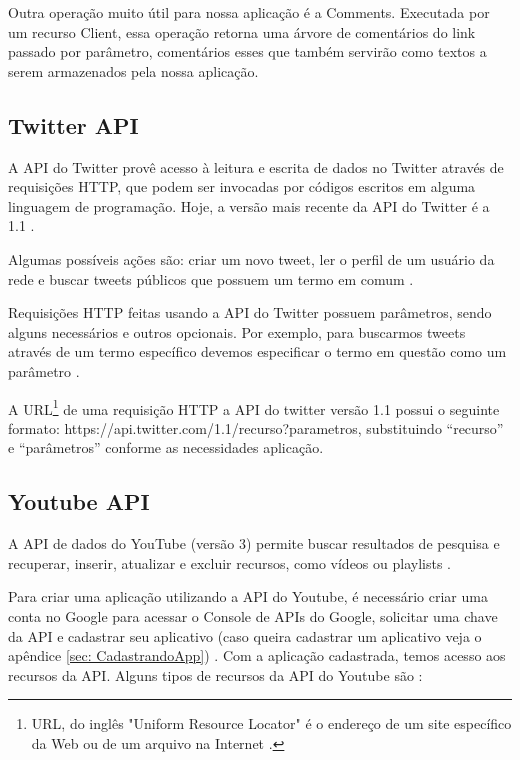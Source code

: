 Outra operação muito útil para nossa aplicação é a Comments. Executada por um recurso Client, essa operação retorna uma árvore de comentários do link passado por parâmetro, comentários esses que também servirão como textos a serem armazenados pela nossa aplicação.
    
    \subsection{Twitter API}
    \label{subsec: TwitterAPI}
A API do Twitter provê acesso à leitura e escrita de dados no Twitter através de requisições HTTP, que podem ser invocadas por códigos escritos em alguma linguagem de programação. Hoje, a versão mais recente da API do Twitter é a 1.1 \cite{TwitterRestApi}.

Algumas possíveis ações são: criar um novo tweet, ler o perfil de um usuário da rede e buscar tweets públicos que possuem um termo em comum \cite{TwitterRestApi}.

Requisições HTTP feitas usando a API do Twitter possuem parâmetros, sendo alguns necessários e outros opcionais. Por exemplo, para buscarmos tweets através de um termo específico devemos especificar o termo em questão como um parâmetro \cite{TwitterSearchApi}.

A URL\footnote{URL, do inglês "Uniform Resource Locator" é o endereço de um site específico da Web ou de um arquivo na Internet \cite{URLDef}.} de uma requisição HTTP a API do twitter versão 1.1 possui o seguinte formato: https://api.twitter.com/1.1/recurso?parametros, substituindo “recurso” e “parâmetros” conforme as necessidades aplicação.

    \subsection{Youtube API}
    \label{subsec: YoutubeAPI}
A API de dados do YouTube (versão 3) permite buscar resultados de pesquisa e recuperar, inserir, atualizar e excluir recursos, como vídeos ou playlists \cite{YouTubeAPI}.

Para criar uma aplicação utilizando a API do Youtube, é necessário criar uma conta no Google para acessar o Console de APIs do Google, solicitar uma chave da API e cadastrar seu aplicativo (caso queira cadastrar um aplicativo veja o apêndice \ref{sec: CadastrandoApp}) \cite{GettingStartedYoutubeAPI}. Com a aplicação cadastrada, temos acesso aos recursos da API. Alguns tipos de recursos da API do Youtube são \cite{GettingStartedYoutubeAPI}:

